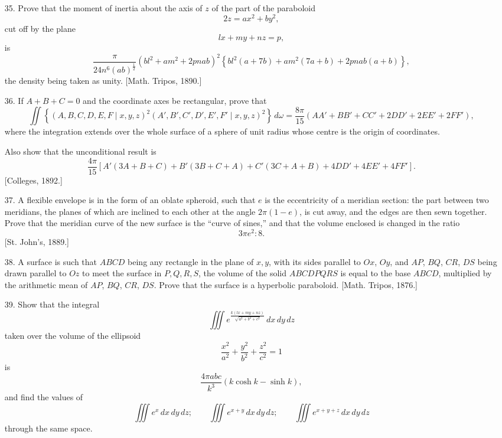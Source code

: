 \documentclass[11pt, a4paper]{article}
\newcommand{\source}[1]{\hfill\textnormal{[#1]}}
\begin{document}
\begin{enumerate}[leftmargin=2em]
\item[35.] Prove that the moment of inertia about the axis of $z$ of the part of the paraboloid
\[
2z=ax^2+by^2,
\]
cut off by the plane
\[
lx+my+nz=p,
\]
is
\[
\frac{\pi}{24n^6(ab)^{\frac12}}
(bl^2+am^2+2pnab)^2
\left\{
bl^2(a+7b)+am^2(7a+b)+2pnab(a+b)
\right\},
\]
the density being taken as unity.
\source{Math. Tripos, 1890.}

\item[36.] If $A+B+C=0$ and the coordinate axes be rectangular, prove that
\[
\iint\left\{(A,B,C,D,E,F\mid x,y,z)^2
(A',B',C',D',E',F'\mid x,y,z)^2\right\}\,d\omega
=
\frac{8\pi}{15}
(AA'+BB'+CC'+2DD'+2EE'+2FF'),
\]
where the integration extends over the whole surface of a sphere of unit radius whose centre is the origin of coordinates.

Also show that the unconditional result is
\[
\frac{4\pi}{15}
\left[
A'(3A+B+C)+B'(3B+C+A)+C'(3C+A+B)
+4DD'+4EE'+4FF'
\right].
\]
\source{Colleges, 1892.}

\item[37.] A flexible envelope is in the form of an oblate spheroid, such that $e$ is the eccentricity of a meridian section: the part between two meridians, the planes of which are inclined to each other at the angle $2\pi(1-e)$, is cut away, and the edges are then sewn together. Prove that the meridian curve of the new surface is the ``curve of sines,'' and that the volume enclosed is changed in the ratio
\[
3\pi e^2:8.
\]
\source{St. John's, 1889.}

\item[38.] A surface is such that $ABCD$ being any rectangle in the plane of $x,y$, with its sides parallel to $Ox$, $Oy$, and $AP$, $BQ$, $CR$, $DS$ being drawn parallel to $Oz$ to meet the surface in $P,Q,R,S$, the volume of the solid $ABCDPQRS$ is equal to the base $ABCD$, multiplied by the arithmetic mean of $AP$, $BQ$, $CR$, $DS$. Prove that the surface is a hyperbolic paraboloid.
\source{Math. Tripos, 1876.}

\item[39.] Show that the integral
\[
\iiint
e^{\frac{k(lx+my+nz)}{\sqrt{a^2+b^2+c^2}}}\,dx\,dy\,dz
\]
taken over the volume of the ellipsoid
\[
\frac{x^2}{a^2}+\frac{y^2}{b^2}+\frac{z^2}{c^2}=1
\]
is
\[
\frac{4\pi abc}{k^3}(k\cosh k-\sinh k),
\]
and find the values of
\[
\iiint e^x\,dx\,dy\,dz;\qquad
\iiint e^{x+y}\,dx\,dy\,dz;\qquad
\iiint e^{x+y+z}\,dx\,dy\,dz
\]
through the same space.

\end{enumerate}
\end{document}
